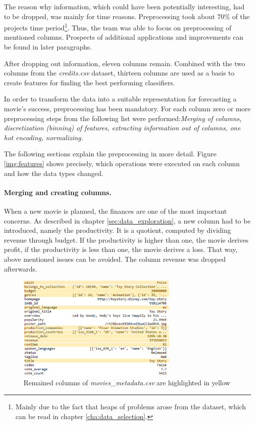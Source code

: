 The reason why information, which could have been potentially interesting, had to be dropped, was mainly for time reasons. Preprocessing took about 70\% of the projects time period\footnote{Mainly due to the fact that heaps of problems arose from the dataset, which can be read in chapter \ref{cha:data_selection}.}. Thus, the team was able to focus on preprocessing of mentioned columns. Prospects of additional applications and improvements can be found in later paragraphs.

After dropping out information, eleven columns remain. Combined with the two columns from the \textit{credits.csv} dataset, thirteen columns are used as a basis to create features for finding the best performing classifiers.

In order to transform the data into a suitable representation for forecasting a movie's success, preprocessing has been mandatory. For each column zero or more preprocessing steps from the following list were performed:\textit{Merging of columns, discretization (binning) of features, extracting information out of columns, one hot encoding, normalizing.}

The following sections explain the preprocessing in more detail. Figure \ref{img:features} shows precisely, which operations were executed on each column and how the data types changed.


\paragraph{Merging and creating columns.}
\label{sec:merge_create}
When a new movie is planned, the finances are one of the most important concerns. As described in chapter \ref{sec:data_exploration}, a new column had to be introduced, namely the productivity. It is a quotient, computed by dividing revenue through budget. If the productivity is higher than one, the movie derives profit, if the productivity is less than one, the movie derives a loss. That way, above mentioned issues can be avoided. The column revenue was dropped afterwards.
\begin{figure}
	\includegraphics[width=0.7\textwidth]{images/3_metadata_columns.png}
	\caption{Remained columns of \textit{movies\_metadata.csv} are highlighted in yellow}
	\label{img:mm_columns}
\end{figure}
\FloatBarrier

